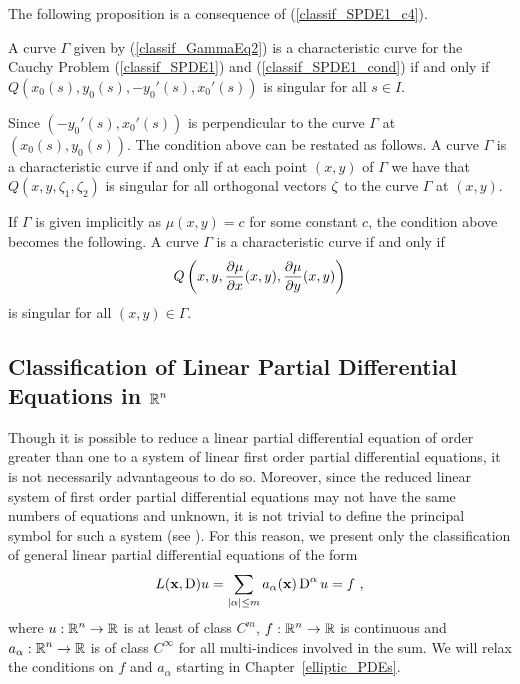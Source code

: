 The following proposition is a consequence of (\ref{classif_SPDE1_c4}).

\begin{prop}
A curve $\Gamma$ given by (\ref{classif_GammaEq2}) is a characteristic
curve for the Cauchy Problem (\ref{classif_SPDE1}) and
(\ref{classif_SPDE1_cond}) if and only if
$Q(x_0(s),y_0(s), -y_0'(s) , x_0'(s))$
is singular for all $s \in I$.
\end{prop}

Since $(-y_0'(s) , x_0'(s))$ is perpendicular to the curve $\Gamma$ at
$(x_0(s), y_0(s))$.  The condition above can be restated as follows.
A curve $\Gamma$ is a characteristic curve if and only if
at each point $(x,y)$ of $\Gamma$ we have that
$Q(x,y, \zeta_1 , \zeta_2)$ is singular for all orthogonal vectors
$\mathbf{\zeta}$ to the curve $\Gamma$ at $(x,y)$.

If $\Gamma$ is given implicitly as $\mu(x,y) = c$ for some constant
$c$, the condition above becomes the following.
A curve $\Gamma$ is a characteristic curve if and only if
\[
Q\left(x,y, \frac{\partial{\mu}}{\partial x}(x,y), \frac{\partial{\mu}}{\partial y}(x,y) \right)
\]
is singular for all $(x,y) \in \Gamma$.

\subsection{Classification of Linear Partial Differential Equations in
$\displaystyle \mathbb{R}^n$}

Though it is possible to reduce a linear partial differential equation
of order greater than one to a system of linear first order partial
differential equations, it is not necessarily
advantageous to do so.  Moreover, since the reduced linear system of
first order partial differential equations may not have the same
numbers of equations and unknown, it is not trivial to define the
principal symbol for such a system (see \cite{RenRog}).  For this
reason, we present only the
classification of general linear partial differential equations of the form
\begin{equation} \label{classif_gen_class}
L(\mathbf{x}, \operatorname{D})u = \sum_{|\alpha|\leq m} a_\alpha(\mathbf{x})
\operatorname{D}^\alpha u = f \ ,
\end{equation}
where $\displaystyle u:\mathbb{R}^n \rightarrow \mathbb{R}$ is at least of class
$\displaystyle C^m$, $\displaystyle f:\mathbb{R}^n \rightarrow \mathbb{R}$ is continuous and
$\displaystyle a_\alpha:\mathbb{R}^n \rightarrow \mathbb{R}$ is of class
$\displaystyle C^\infty$ for all multi-indices involved in the sum.
We will relax the conditions on $f$
and $a_\alpha$ starting in Chapter~\ref{elliptic_PDEs}.

